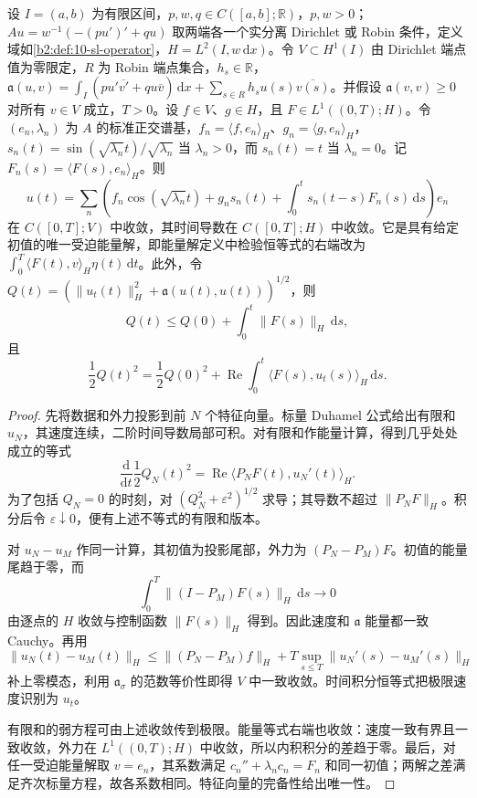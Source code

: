 \begin{proposition}[一般外力的波动解]\label{b2:prop:10-forced-wave-energy}
设 \(I=(a,b)\) 为有限区间，\(p,w,q\in C([a,b];\mathbb R)\)，\(p,w>0\)；\(Au=w^{-1}(-(pu')'+qu)\) 取两端各一个实分离 Dirichlet 或 Robin 条件，定义域如\cref{b2:def:10-sl-operator}，\(H=L^2(I,w\,\mathrm dx)\)。令 \(V\subset H^1(I)\) 由 Dirichlet 端点值为零限定，\(R\) 为 Robin 端点集合，\(h_s\in\mathbb R\)，\(\mathfrak a(u,v)=\int_I(pu'\overline{v'}+qu\overline v)\,\mathrm dx+\sum_{s\in R}h_su(s)\overline{v(s)}\)。并假设 \(\mathfrak a(v,v)\geq0\) 对所有 \(v\in V\) 成立，\(T>0\)。设 \(f\in V\)、\(g\in H\)，且 \(F\in L^1((0,T);H)\)。令 \((e_n,\lambda_n)\) 为 \(A\) 的标准正交谱基，\(f_n=\langle f,e_n\rangle_H\)、\(g_n=\langle g,e_n\rangle_H\)，\(s_n(t)=\sin(\sqrt{\lambda_n}t)/\sqrt{\lambda_n}\) 当 \(\lambda_n>0\)，而 \(s_n(t)=t\) 当 \(\lambda_n=0\)。记 \(F_n(s)=\langle F(s),e_n\rangle_H\)。则
\[
 u(t)=\sum_n\left(f_n\cos(\sqrt{\lambda_n}t)+g_ns_n(t)
 +\int_0^ts_n(t-s)F_n(s)\,\mathrm{d}s\right)e_n
\]
在 \(C([0,T];V)\) 中收敛，其时间导数在 \(C([0,T];H)\) 中收敛。它是具有给定初值的唯一受迫能量解，即能量解定义中检验恒等式的右端改为
\(\int_0^T\langle F(t),v\rangle_H\eta(t)\,\mathrm{d}t\)。此外，令
\(Q(t)=(\|u_t(t)\|_H^2+\mathfrak a(u(t),u(t)))^{1/2}\)，则
\[
 Q(t)\leq Q(0)+\int_0^t\|F(s)\|_H\,\mathrm{d}s,
\]
且
\[
 \dfrac12Q(t)^2=\dfrac12Q(0)^2
 +\operatorname{Re}\int_0^t\langle F(s),u_t(s)\rangle_H\,\mathrm{d}s.
\]
\end{proposition}
\begin{proof}
先将数据和外力投影到前 \(N\) 个特征向量。标量 Duhamel 公式给出有限和 \(u_N\)，其速度连续，二阶时间导数局部可积。对有限和作能量计算，得到几乎处处成立的等式
\[
 \dfrac{\mathrm{d}}{\mathrm{d}t}\dfrac12Q_N(t)^2
 =\operatorname{Re}\langle P_NF(t),u_N'(t)\rangle_H.
\]
为了包括 \(Q_N=0\) 的时刻，对 \((Q_N^2+\varepsilon^2)^{1/2}\) 求导；其导数不超过 \(\|P_NF\|_H\)。积分后令 \(\varepsilon\downarrow0\)，便有上述不等式的有限和版本。

对 \(u_N-u_M\) 作同一计算，其初值为投影尾部，外力为 \((P_N-P_M)F\)。初值的能量尾趋于零，而
\[
 \int_0^T\|(I-P_M)F(s)\|_H\,\mathrm{d}s\longrightarrow0
\]
由逐点的 \(H\) 收敛与控制函数 \(\|F(s)\|_H\) 得到。因此速度和 \(\mathfrak a\) 能量都一致 Cauchy。再用
\[
 \|u_N(t)-u_M(t)\|_H
 \leq\|(P_N-P_M)f\|_H
 +T\sup_{s\leq T}\|u_N'(s)-u_M'(s)\|_H
\]
补上零模态，利用 \(\mathfrak a_\sigma\) 的范数等价性即得 \(V\) 中一致收敛。时间积分恒等式把极限速度识别为 \(u_t\)。

有限和的弱方程可由上述收敛传到极限。能量等式右端也收敛：速度一致有界且一致收敛，外力在 \(L^1((0,T);H)\) 中收敛，所以内积积分的差趋于零。最后，对任一受迫能量解取 \(v=e_n\)，其系数满足 \(c_n''+\lambda_nc_n=F_n\) 和同一初值；两解之差满足齐次标量方程，故各系数相同。特征向量的完备性给出唯一性。
\end{proof}

